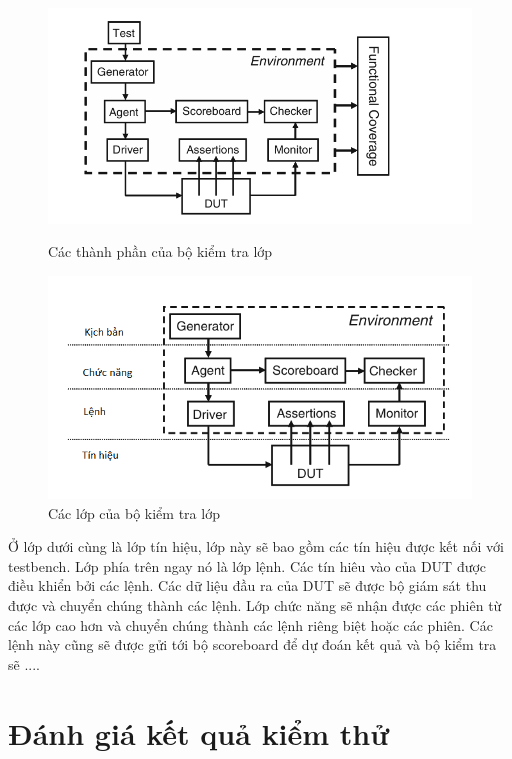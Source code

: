 \begin{figure}[!ht]
	\centering
	\begin{minipage}[t]{0.48\linewidth}
		\centering
		\includegraphics[width=\linewidth]{figures/layeredTestbench.png}
		\caption{Các thành phần của bộ kiểm tra lớp}
		\label{fig:layeredTestbench}
	\end{minipage}
	\hfill
	\begin{minipage}[t]{0.48\linewidth}
		\centering
		\includegraphics[width=\linewidth]{figures/layeredLayer.png}
		\caption{Các lớp của bộ kiểm tra lớp}
		\label{fig:layeredLayer}
	\end{minipage}
\end{figure}

Ở lớp dưới cùng là lớp tín hiệu, lớp này sẽ bao gồm các tín hiệu được kết nối với testbench. Lớp phía trên ngay nó là lớp lệnh. Các tín hiêu vào của DUT được điều khiển bởi các lệnh. Các dữ liệu đầu ra của DUT sẽ được bộ giám sát thu được và chuyển chúng thành các lệnh. Lớp chức năng sẽ nhận được các phiên từ các lớp cao hơn và chuyển chúng thành các lệnh riêng biệt hoặc các phiên. Các lệnh này cũng sẽ được gửi tới bộ scoreboard để dự đoán kết quả và bộ kiểm tra sẽ ....

\section{Đánh giá kết quả kiểm thử}

